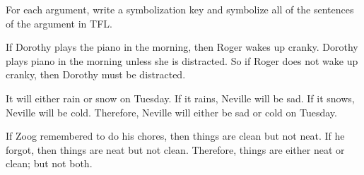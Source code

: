 \problempart
For each argument, write a symbolization key and symbolize all of the sentences of the argument in TFL.
\begin{compactlist}
\item If Dorothy plays the piano in the morning, then Roger wakes up cranky. Dorothy plays piano in the morning unless she is distracted. So if Roger does not wake up cranky, then Dorothy must be distracted.
\item[] 
\item It will either rain or snow on Tuesday. If it rains, Neville will be sad. If it snows, Neville will be cold. Therefore, Neville will either be sad or cold on Tuesday.
\item[] 
\item If Zoog remembered to do his chores, then things are clean but not neat. If he forgot, then things are neat but not clean. Therefore, things are either neat or clean; but not both.
\item[] 
\end{compactlist}


